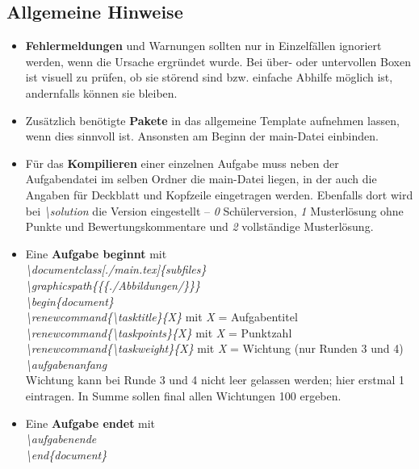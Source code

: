 \documentclass[../main.tex]{subfiles}
\begin{document}
\subsection{Allgemeine Hinweise}
\begin{itemize}
    \item \textbf{Fehlermeldungen} und Warnungen sollten nur in Einzelf\"allen ignoriert werden, wenn die Ursache ergr\"undet wurde. Bei \"uber- oder untervollen Boxen ist visuell zu pr\"ufen, ob sie st\"orend sind bzw. einfache Abhilfe m\"oglich ist, andernfalls k\"onnen sie bleiben. 
    \item Zus\"atzlich ben\"otigte \textbf{Pakete} in das allgemeine Template aufnehmen lassen, wenn dies sinnvoll ist. Ansonsten am Beginn der main-Datei einbinden. 
    \item F\"ur das \textbf{Kompilieren} einer einzelnen Aufgabe muss neben der Aufgabendatei im selben Ordner die main-Datei liegen, in der auch die Angaben f\"ur Deckblatt und Kopfzeile eingetragen werden. Ebenfalls dort wird bei \hypertarget{solution}{\textit{\textbackslash solution}} die Version eingestellt -- \textit{0} Sch\"ulerversion, \textit{1} Musterl\"osung ohne Punkte und Bewertungskommentare und \textit{2} vollst\"andige Musterl\"osung. 
    \item Eine \textbf{Aufgabe beginnt} mit \\\textit{\textbackslash documentclass[./main.tex]\{subfiles\}\\\textbackslash graphicspath\{\{\subfix\{./Abbildungen/\}\}\}\\\textbackslash begin\{document\}\\\textbackslash renewcommand\{\textbackslash tasktitle\}\{X\}} mit \textit{X} = Aufgabentitel\\\textit{\textbackslash renewcommand\{\textbackslash taskpoints\}\{X\}} mit \textit{X} = Punktzahl\\\textit{\textbackslash renewcommand\{\textbackslash taskweight\}\{X\}} mit \textit{X} = Wichtung (nur Runden 3 und 4)\\
    \textit{\hypertarget{aufgabenanfang}{\textbackslash aufgabenanfang}}\\
    Wichtung kann bei Runde 3 und 4 nicht leer gelassen werden; hier erstmal 1 eintragen. In Summe sollen final allen Wichtungen 100 ergeben.
    \item Eine \textbf{Aufgabe endet} mit \\
    \textit{\hypertarget{aufgabenende}{\textbackslash aufgabenende}}\\\textit{\textbackslash end\{document\}}

\end{itemize}
\end{document}
